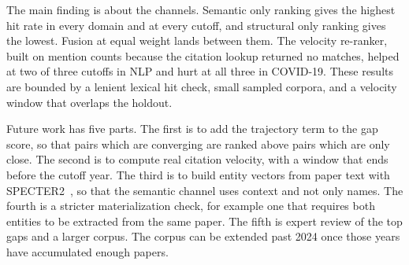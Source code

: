 \documentclass{ieeeaccess}
\begin{document}
The main finding is about the channels. Semantic only ranking gives the highest hit rate in every domain and at every cutoff, and structural only ranking gives the lowest. Fusion at equal weight lands between them. The velocity re-ranker, built on mention counts because the citation lookup returned no matches, helped at two of three cutoffs in NLP and hurt at all three in COVID-19. These results are bounded by a lenient lexical hit check, small sampled corpora, and a velocity window that overlaps the holdout.

Future work has five parts. The first is to add the trajectory term to the gap score, so that pairs which are converging are ranked above pairs which are only close. The second is to compute real citation velocity, with a window that ends before the cutoff year. The third is to build entity vectors from paper text with SPECTER2~\cite{singh2023scirepeval}, so that the semantic channel uses context and not only names. The fourth is a stricter materialization check, for example one that requires both entities to be extracted from the same paper. The fifth is expert review of the top gaps and a larger corpus. The corpus can be extended past 2024 once those years have accumulated enough papers.


\end{document}
